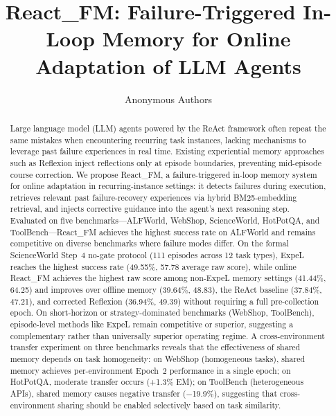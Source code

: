 \documentclass{article}
\title{React\_FM: Failure-Triggered In-Loop Memory for Online Adaptation of LLM Agents}
\author{
Anonymous Authors
}
\newcommand{\method}{React\_FM}
\begin{document}
\maketitle

\begin{abstract}
Large language model (LLM) agents powered by the ReAct framework often repeat the same mistakes when encountering recurring task instances, lacking mechanisms to leverage past failure experiences in real time. Existing experiential memory approaches such as Reflexion inject reflections only at episode boundaries, preventing mid-episode course correction. We propose \method{}, a failure-triggered in-loop memory system for online adaptation in recurring-instance settings: it detects failures during execution, retrieves relevant past failure-recovery experiences via hybrid BM25-embedding retrieval, and injects corrective guidance into the agent's next reasoning step. Evaluated on five benchmarks---ALFWorld, WebShop, ScienceWorld, HotPotQA, and ToolBench---\method{} achieves the highest success rate on ALFWorld and remains competitive on diverse benchmarks where failure modes differ. On the formal ScienceWorld Step~4 no-gate protocol (111 episodes across 12 task types), ExpeL reaches the highest success rate (49.55\%, 57.78 average raw score), while online \method{} achieves the highest raw score among non-ExpeL memory settings (41.44\%, 64.25) and improves over offline memory (39.64\%, 48.83), the ReAct baseline (37.84\%, 47.21), and corrected Reflexion (36.94\%, 49.39) without requiring a full pre-collection epoch. On short-horizon or strategy-dominated benchmarks (WebShop, ToolBench), episode-level methods like ExpeL remain competitive or superior, suggesting a complementary rather than universally superior operating regime. A cross-environment transfer experiment on three benchmarks reveals that the effectiveness of shared memory depends on task homogeneity: on WebShop (homogeneous tasks), shared memory achieves per-environment Epoch~2 performance in a single epoch; on HotPotQA, moderate transfer occurs (+1.3\% EM); on ToolBench (heterogeneous APIs), shared memory causes negative transfer ($-$19.9\%), suggesting that cross-environment sharing should be enabled selectively based on task similarity.
\end{abstract}









\end{document}
